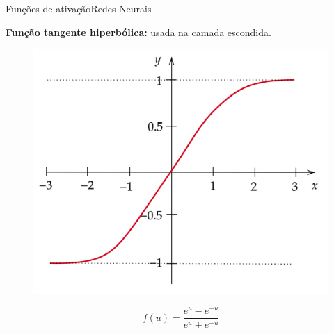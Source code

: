 \documentclass[t]{beamer}
\begin{document}
\begin{ftst}{Funções de ativação}{Redes Neurais}

\textbf{Função tangente hiperbólica:} usada na camada escondida.

\begin{figure}[!htb]
    \centering
    \begin{minipage}{.5\textwidth}
        \centering
        \includegraphics[scale=0.12]{Figuras/tanh.png}
        \label{fig:prob1_6_2}
    \end{minipage}%
    \begin{minipage}{0.5\textwidth}
        \centering
        \begin{equation}
            f(u) = \frac{e^{u}-e^{-u}}{e^{u}+e^{-u}}
        \end{equation}
         \left [ -1, 1]
    \end{minipage}
\end{figure}
\end{ftst}

\end{document}
